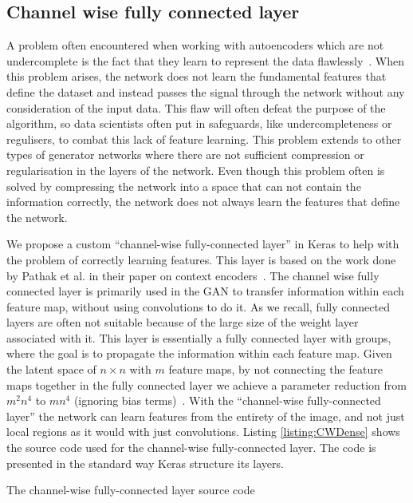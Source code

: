 \subsection{Channel wise fully connected layer}
\label{cha:CWDense}
A problem often encountered when working with autoencoders which are not undercomplete is the fact that they learn to represent the data flawlessly~\cite{OvercompleteAE}.
When this problem arises, the network does not learn the fundamental features that define the dataset and instead passes the signal through the network without any consideration of the input data.
This flaw will often defeat the purpose of the algorithm, so data scientists often put in safeguards, like undercompleteness or regulisers, to combat this lack of feature learning. 
This problem extends to other types of generator networks where there are not sufficient compression or regularisation in the layers of the network.
Even though this problem often is solved by compressing the network into a space that can not contain the information correctly, the network does not always learn the features that define the network. 

We propose a custom ``channel-wise fully-connected layer'' in Keras to help with the problem of correctly learning features. This layer is based on the work done by Pathak et al. in their paper on context encoders~\cite{Pathak_2016}.
The channel wise fully connected layer is primarily used in the GAN to transfer information within each feature map, without using convolutions to do it. As we recall, fully connected layers are often not suitable because of the large size of the weight layer associated with it. This layer is essentially a fully connected layer with groups, where the goal is to propagate the information within each feature map.
Given the latent space of $n \times n$ with $m$ feature maps, by not connecting the feature maps together in the fully connected layer we achieve a parameter reduction from $m^2n^4$ to $mn^4$ (ignoring bias terms)~\cite{Pathak_2016}.
With the ``channel-wise fully-connected layer'' the network can learn features from the entirety of the image, and not just local regions as it would with just convolutions. 
Listing \ref{listing:CWDense} shows the source code used for the channel-wise fully-connected layer. The code is presented in the standard way Keras structure its layers. 

\begin{listing}

\caption{The channel-wise fully-connected layer source code}
\label{listing:CWDense}
\end{listing}

